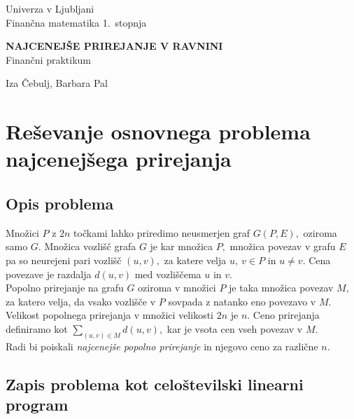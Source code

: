 \documentclass[a4paper, 11pt]{article}
\newcommand{\program}{Finančna matematika 1.~stopnja} %
\newcommand{\imeavtorja}{Iza Čebulj, Barbara Pal} %
\newcommand{\naslovdela}{Najcenejše prirejanje v ravnini}
\newcommand{\letnica}{2022}
\newcommand{\predmet}{Finančni praktikum}
\begin{document}
\thispagestyle{empty}
\begin{center}
\begin{minipage}{0.75\linewidth}
    \centering
    {\Large Univerza v Ljubljani \\ \program}
    \\
    \vspace{3cm}

    {\uppercase{\Large \textbf{\naslovdela}}} \\ \predmet\\
    \vspace{3cm}

    {\Large \imeavtorja\par}
    \vspace{9cm}

\end{minipage}
\end{center}

\noindent{\large
Ljubljana, \letnica}
\pagebreak

\thispagestyle{empty}
\tableofcontents
\listoffigures
\pagebreak

\section{Reševanje osnovnega problema najcenejšega prirejanja}
\subsection{Opis problema}
Množici $P$ z $2n$ točkami lahko priredimo neusmerjen graf $G(P,E),$ oziroma samo $G.$
Množica vozlišč grafa $G$ je kar množica $P,$ množica povezav v grafu $E$ pa so neurejeni pari vozlišč $(u,v),$ za katere velja $u,~v \in P$ in $u \neq v.$ 
Cena povezave je razdalja $d(u,v)$ med vozliščema $u$ in $v.$ \\
Popolno prirejanje na grafu $G$ oziroma v množici $P$ je taka množica povezav $M,$ za katero velja, da vsako vozlišče v $P$ sovpada z natanko eno povezavo v $M$.
Velikost popolnega prirejanja v množici velikosti $2n$ je $n.$ 
Ceno prirejanja definiramo kot $\sum_{(u,v) \in M} d(u,v),$ kar je vsota cen vseh povezav v $M.$ \\
Radi bi poiskali \emph{najcenejše popolno prirejanje} in njegovo ceno za različne $n.$

\subsection{Zapis problema kot celoštevilski linearni program}
\end{document}
